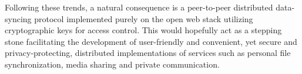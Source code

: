 Following these trends, a natural consequence is a peer-to-peer distributed data-syncing protocol implemented purely on the open web stack utilizing cryptographic keys for access control. This would hopefully act as a stepping stone facilitating the development of user-friendly and convenient, yet secure and privacy-protecting, distributed implementations of services such as personal file synchronization, media sharing and private communication.
